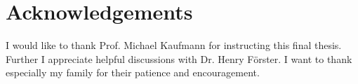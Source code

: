 \section{Acknowledgements}
I would like to thank Prof. Michael Kaufmann for instructing this final thesis. Further I appreciate helpful discussions with Dr. Henry Förster. I want to thank especially my family for their patience and encouragement.